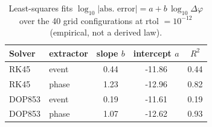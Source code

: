\begin{table}[!htbp]
\centering
\caption{Least-squares fits $\log_{10}|\text{abs.\ error}| = a + b\,\log_{10}\Delta\varphi$ over the 40 grid configurations at rtol $=10^{-12}$ (empirical, not a derived law).}
\label{tab:fits}
\begin{tabular}{llccc}
\toprule
Solver & extractor & slope $b$ & intercept $a$ & $R^2$ \\
\midrule
RK45 & event & 0.44 & -11.86 & 0.44 \\
RK45 & phase & 1.23 & -12.96 & 0.82 \\
DOP853 & event & 0.19 & -11.61 & 0.19 \\
DOP853 & phase & 1.07 & -12.62 & 0.93 \\
\bottomrule
\end{tabular}
\end{table}

